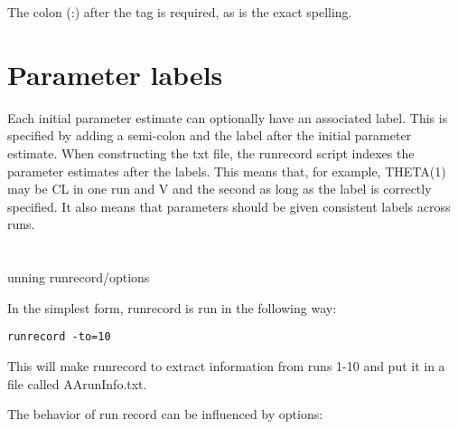 \documentclass[a4paper,12pt]{article}
\begin{document}
The colon (:) after the tag is required, as is the exact spelling.

\section{Parameter labels}
Each initial parameter estimate can optionally have an associated label. This is specified by adding a semi-colon and the label after the initial parameter estimate. When constructing  the txt file, the runrecord script indexes the parameter estimates after the labels. This means that, for example, THETA(1) may be CL in one run and V and the second as long as the label is correctly specified. It also means that parameters should be given consistent labels across runs.

\section{}unning runrecord/options

In the simplest form, runrecord is run in the following way:

\begin{verbatim}
runrecord -to=10
\end{verbatim}

This will make runrecord to extract information from runs 1-10 and put it in a file called AArunInfo.txt. 

The behavior of run record can be influenced by options:
\end{document}
